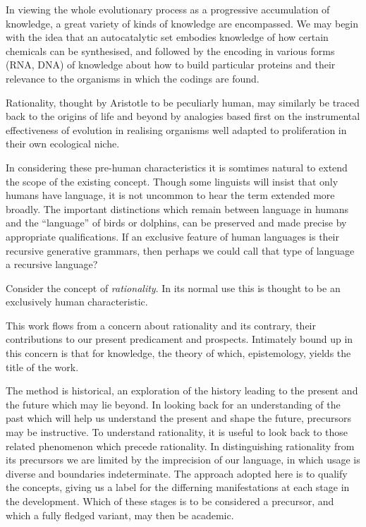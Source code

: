 \documentclass[10pt,titlepage]{book}
\begin{document}
In viewing the whole evolutionary process as a progressive accumulation of knowledge, a great variety of kinds of knowledge are encompassed.
We may begin with the idea that an autocatalytic set embodies knowledge of how certain chemicals can be synthesised, and followed by the encoding in various forms (RNA, DNA) of knowledge about how to build particular proteins and their relevance to the organisms in which the codings are found.

Rationality, thought by Aristotle to be peculiarly human, may similarly be traced back to the origins of life and beyond by analogies based first on the instrumental effectiveness of evolution in realising organisms well adapted to proliferation in their own ecological niche.


In considering these pre-human characteristics it is somtimes natural to extend the scope of the existing concept.
Though some linguists will insist that only humans have language, it is not uncommon to hear the term extended more broadly.
The important distinctions which remain between language in humans and the ``language'' of birds or dolphins, can be preserved and made precise by appropriate qualifications.
If an exclusive feature of human languages is their recursive generative grammars, then perhaps we could call that type of language a recursive language?

Consider the concept of \emph{rationality}.
In its normal use this is thought to be an exclusively human characteristic.

This work flows from a concern about rationality and its contrary, their contributions to our present predicament and prospects.
Intimately bound up in this concern is that for knowledge, the theory of which, epistemology, yields the title of the work.

The method is historical, an exploration of the history leading to the present and the future which may lie beyond.
In looking back for an understanding of the past which will help us understand the present and shape the future, precursors may be instructive.
To understand rationality, it is useful to look back to those related phenomenon which precede rationality.
In distinguishing rationality from its precursors we are limited by the imprecision of our language, in which usage is diverse and boundaries indeterminate.
The approach adopted here is to qualify the concepts, giving us a label for the differning manifestations at each stage in the development.
Which of these stages is to be considered a precursor, and which a fully fledged variant, may then be academic.
\end{document}
